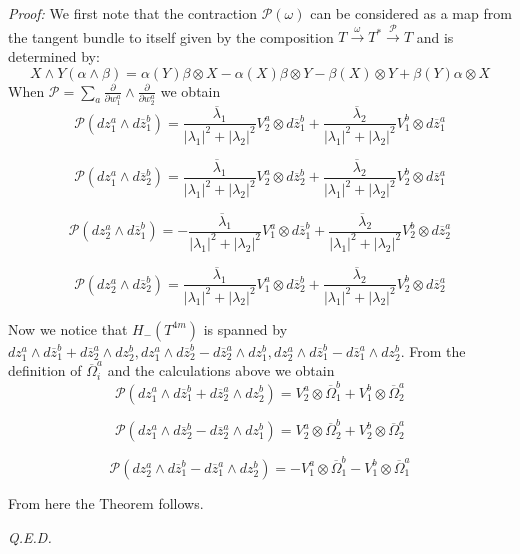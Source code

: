 \documentclass[11pt,oneside,leqno]{amsart}
\theoremstyle{plain}
\theoremstyle{definition}
\begin{document}
{\it Proof:} We first note that the contraction $\mathcal{P}(\omega)$ can be considered as a map from the tangent bundle to itself given by the composition $T\stackrel{\omega}\to T^*\stackrel{\mathcal{P}}\to T$  and is determined by:
$$X\wedge Y(\alpha\wedge\beta) = \alpha(Y)\beta\otimes X-\alpha(X)\beta\otimes Y-\beta(X)\otimes Y + \beta(Y)\alpha\otimes X$$
When $\mathcal{P} = \sum_a\frac{\partial}{\partial w_1^a}\wedge \frac{\partial}{\partial w_2^a}$ we obtain
$$\mathcal{P}(dz_1^a\wedge d\overline{z}_1^b)=\frac{\overline{\lambda}_1}{|\lambda_1|^2+|\lambda_2|^2}V_2^a\otimes d\overline{z}_1^b+\frac{\overline{\lambda}_2}{|\lambda_1|^2+|\lambda_2|^2}V_1^b\otimes d\overline{z}_1^a$$

$$\mathcal{P}(dz_1^a\wedge d\overline{z}_2^b)=\frac{\overline{\lambda}_1}{|\lambda_1|^2+|\lambda_2|^2}V_2^a\otimes d\overline{z}_2^b+\frac{\overline{\lambda}_2}{|\lambda_1|^2+|\lambda_2|^2}V_2^b\otimes d\overline{z}_1^a$$

$$\mathcal{P}(dz_2^a\wedge d\overline{z}_1^b)=-\frac{\overline{\lambda}_1}{|\lambda_1|^2+|\lambda_2|^2}V_1^a\otimes d\overline{z}_1^b+\frac{\overline{\lambda}_2}{|\lambda_1|^2+|\lambda_2|^2}V_2^b\otimes d\overline{z}_2^a$$

$$\mathcal{P}(dz_2^a\wedge d\overline{z}_2^b)=\frac{\overline{\lambda}_1}{|\lambda_1|^2+|\lambda_2|^2}V_1^a\otimes d\overline{z}_2^b+\frac{\overline{\lambda}_2}{|\lambda_1|^2+|\lambda_2|^2}V_2^b\otimes d\overline{z}_2^a$$

Now we notice that $H_-(T^{4m})$ is spanned by $dz_1^a\wedge d\overline{z}_1^b+d\overline{z}_2^a\wedge dz_2^b, dz_1^a\wedge d\overline{z}_2^b-d\overline{z}_2^a\wedge dz_1^b, dz_2^a\wedge d\overline{z}_1^b-d\overline{z}_1^a\wedge dz_2^b$. From the definition of $\overline{\Omega}_i^a$ and the calculations above we obtain
$$\mathcal{P}(dz_1^a\wedge d\overline{z}_1^b+d\overline{z}_2^a\wedge dz_2^b) = V_2^a\otimes\overline{\Omega}_1^b+ V_1^b\otimes\overline{\Omega}_2^a$$

$$\mathcal{P}(dz_1^a\wedge d\overline{z}_2^b-d\overline{z}_2^a\wedge dz_1^b) = V_2^a\otimes\overline{\Omega}_2^b+ V_2^b\otimes\overline{\Omega}_2^a$$

$$\mathcal{P}(dz_2^a\wedge d\overline{z}_1^b-d\overline{z}_1^a\wedge dz_2^b) = -V_1^a\otimes\overline{\Omega}_1^b- V_1^b\otimes\overline{\Omega}_1^a$$

From here the Theorem follows.

{\it Q.E.D.}
\end{document}
